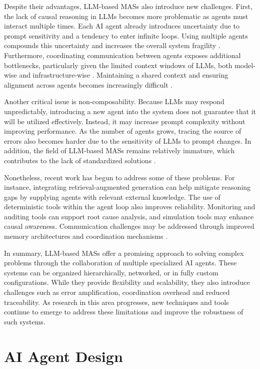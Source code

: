 \documentclass[a4paper,oneside,bibliography=totoc]{scrbook}
\begin{document}
Despite their advantages, \ac{LLM}-based \acp{MAS} also introduce new challenges. First, the lack of causal reasoning in \acp{LLM} becomes more problematic as agents must interact multiple times. Each \ac{AI} agent already introduces uncertainty due to prompt sensitivity and a tendency to enter infinite loops. Using multiple agents compounds this uncertainty and increases the overall system fragility \cite{Sapkota2025}. Furthermore, coordinating communication between agents exposes additional bottlenecks, particularly given the limited context windows of \acp{LLM}, both model-wise and infrastructure-wise \cite{Kwon2023}. Maintaining a shared context and ensuring alignment across agents becomes increasingly difficult \cite{Sapkota2025,Han2025}.

Another critical issue is non-composability. Because \acp{LLM} may respond unpredictably, introducing a new agent into the system does not guarantee that it will be utilized effectively. Instead, it may increase prompt complexity without improving performance. As the number of agents grows, tracing the source of errors also becomes harder due to the sensitivity of \acp{LLM} to prompt changes. In addition, the field of \ac{LLM}-based \acp{MAS} remains relatively immature, which contributes to the lack of standardized solutions \cite{Sapkota2025}.

Nonetheless, recent work has begun to address some of these problems. For instance, integrating retrieval-augmented generation can help mitigate reasoning gaps by supplying agents with relevant external knowledge. The use of deterministic tools within the agent loop also improves reliability. Monitoring and auditing tools can support root cause analysis, and simulation tools may enhance causal awareness. Communication challenges may be addressed through improved memory architectures and coordination mechanisms \cite{Sapkota2025}.

In summary, \ac{LLM}-based \acp{MAS} offer a promising approach to solving complex problems through the collaboration of multiple specialized \ac{AI} agents. These systems can be organized hierarchically, networked, or in fully custom configurations. While they provide flexibility and scalability, they also introduce challenges such as error amplification, coordination overhead and reduced traceability. As research in this area progresses, new techniques and tools continue to emerge to address these limitations and improve the robustness of such systems.

\section{AI Agent Design}
\label{sec:agent_design}
\end{document}

